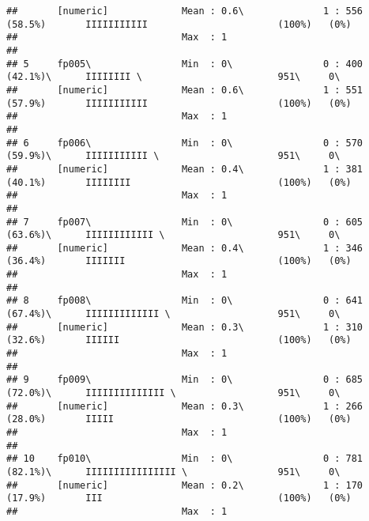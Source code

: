 \documentclass[]{article}
\begin{document}
\begin{verbatim}
##       [numeric]             Mean : 0.6\              1 : 556 (58.5%)       IIIIIIIIIII                       (100%)   (0%)     
##                             Max  : 1                                                                                           
## 
## 5     fp005\                Min  : 0\                0 : 400 (42.1%)\      IIIIIIII \                        951\     0\       
##       [numeric]             Mean : 0.6\              1 : 551 (57.9%)       IIIIIIIIIII                       (100%)   (0%)     
##                             Max  : 1                                                                                           
## 
## 6     fp006\                Min  : 0\                0 : 570 (59.9%)\      IIIIIIIIIII \                     951\     0\       
##       [numeric]             Mean : 0.4\              1 : 381 (40.1%)       IIIIIIII                          (100%)   (0%)     
##                             Max  : 1                                                                                           
## 
## 7     fp007\                Min  : 0\                0 : 605 (63.6%)\      IIIIIIIIIIII \                    951\     0\       
##       [numeric]             Mean : 0.4\              1 : 346 (36.4%)       IIIIIII                           (100%)   (0%)     
##                             Max  : 1                                                                                           
## 
## 8     fp008\                Min  : 0\                0 : 641 (67.4%)\      IIIIIIIIIIIII \                   951\     0\       
##       [numeric]             Mean : 0.3\              1 : 310 (32.6%)       IIIIII                            (100%)   (0%)     
##                             Max  : 1                                                                                           
## 
## 9     fp009\                Min  : 0\                0 : 685 (72.0%)\      IIIIIIIIIIIIII \                  951\     0\       
##       [numeric]             Mean : 0.3\              1 : 266 (28.0%)       IIIII                             (100%)   (0%)     
##                             Max  : 1                                                                                           
## 
## 10    fp010\                Min  : 0\                0 : 781 (82.1%)\      IIIIIIIIIIIIIIII \                951\     0\       
##       [numeric]             Mean : 0.2\              1 : 170 (17.9%)       III                               (100%)   (0%)     
##                             Max  : 1                                                                                           

\end{verbatim}
\end{document}
